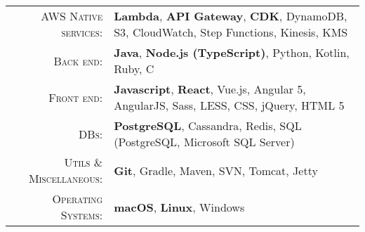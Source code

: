 %
%
%

\renewcommand{\arraystretch}{1.1}

	\begin{tabular}{>{}r>{}p{13cm}}
		\textsc{AWS Native services:} &
			\textbf{Lambda}, \textbf{API Gateway}, \textbf{CDK}, DynamoDB, S3, CloudWatch, Step Functions, Kinesis, KMS  \\
		\textsc{Back end:} &
			\textbf{Java}, \textbf{Node.js (TypeScript)}, Python, Kotlin, Ruby, C \\
		\textsc{Front end:} &
			\textbf{Javascript}, \textbf{React}, Vue.js, Angular 5, AngularJS, Sass, LESS, CSS, jQuery, HTML 5 \\
		\textsc{DBs:} &
			\textbf{PostgreSQL}, Cassandra, Redis, SQL (PostgreSQL, Microsoft SQL Server) \\
		\textsc{Utils \& Miscellaneous:} &
			\textbf{Git}, Gradle, Maven, SVN, Tomcat, Jetty \\
		\textsc{Operating Systems:} &
			\textbf{macOS}, \textbf{Linux}, Windows \\
	\end{tabular}
